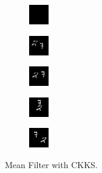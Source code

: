 \begin{subfigure}[t]{0.9\textwidth}
    \centering
    \begin{subfigure}[t]{0.19\textwidth}
        \centering
        \includegraphics[scale=2]{figures/CKKS-MEAN/frame0}
    \end{subfigure}
    \hfill
    \begin{subfigure}[t]{0.19\textwidth}
        \centering
        \includegraphics[scale=2]{figures/CKKS-MEAN/frame4}
    \end{subfigure}
    \hfill
    \begin{subfigure}[t]{0.19\textwidth}
        \centering
        \includegraphics[scale=2]{figures/CKKS-MEAN/frame8}
    \end{subfigure}
    \hfill
    \begin{subfigure}[t]{0.19\textwidth}
        \centering
        \includegraphics[scale=2]{figures/CKKS-MEAN/frame12}
    \end{subfigure}
    \hfill
    \begin{subfigure}[t]{0.19\textwidth}
        \centering
        \includegraphics[scale=2]{figures/CKKS-MEAN/frame16}
    \end{subfigure}
    \caption{Mean Filter with CKKS.}
\end{subfigure}
\\ \bigskip
